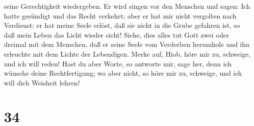 seine Gerechtigkeit wiedergeben.  Er wird singen vor den
Menschen und sagen: Ich hatte gesündigt und das Recht verkehrt; aber er
hat mir nicht vergolten nach Verdienst;  er hat meine
Seele erlöst, daß sie nicht in die Grube gefahren ist, so daß mein Leben
das Licht wieder sieht!  Siehe, dies alles tut Gott zwei
oder dreimal mit dem Menschen,  daß er seine Seele vom
Verderben herumhole und ihn erleuchte mit dem Lichte der Lebendigen.
 Merke auf, Hiob, höre mir zu, schweige, und ich will
reden!  Hast du aber Worte, so antworte mir, sage her,
denn ich wünsche deine Rechtfertigung;  wo aber nicht, so
höre mir zu, schweige, und ich will dich Weisheit lehren!

\hypertarget{section-33}{%
\section{34}\label{section-33}}


